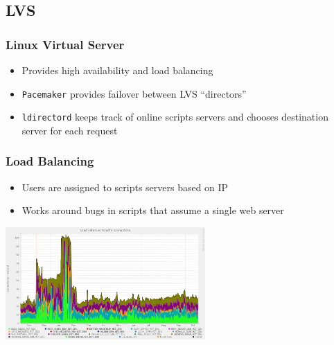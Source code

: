 \subsection{LVS}

\begin{frame}
  \frametitle{Linux Virtual Server}
  \begin{itemize}
    \item Provides high availability and load balancing
    \item {\tt Pacemaker} provides failover between LVS ``directors''
    \item {\tt ldirectord} keeps track of online scripts servers and chooses destination server for each request
  \end{itemize}
\end{frame}

\begin{frame}
  \frametitle{Load Balancing}
  \begin{itemize}
    \item Users are assigned to scripts servers based on IP
    \item Works around bugs in scripts that assume a single web server
  \end{itemize}
  \begin{center}
    \includegraphics[width=3in] {lvs.png}
  \end{center}
\end{frame}

